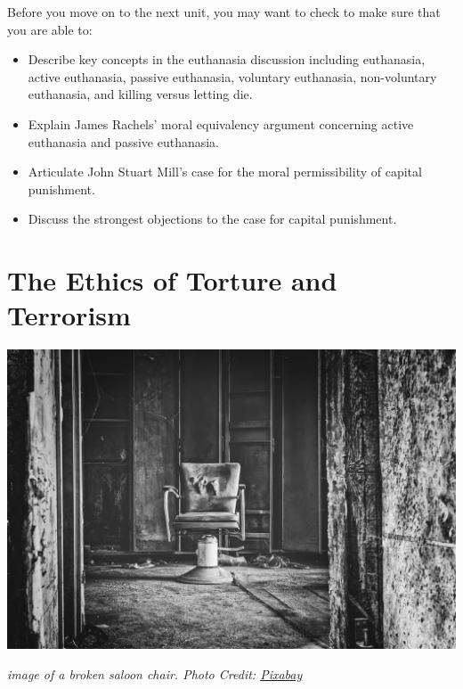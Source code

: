 \documentclass[
]{book}
\providecommand{\tightlist}{%
  \setlength{\itemsep}{0pt}\setlength{\parskip}{0pt}}
\begin{document}
\begin{progress}
Before you move on to the next unit, you may want to check to make sure that you
are able to:

\begin{itemize}
\tightlist
\item
  Describe key concepts in the euthanasia discussion including euthanasia, active euthanasia, passive euthanasia, voluntary euthanasia, non-voluntary euthanasia, and killing versus letting die.\\
\item
  Explain James Rachels' moral equivalency argument concerning active euthanasia and passive euthanasia.\\
\item
  Articulate John Stuart Mill's case for the moral permissibility of capital punishment.\\
\item
  Discuss the strongest objections to the case for capital punishment.
\end{itemize}
\end{progress}

\hypertarget{the-ethics-of-torture-and-terrorism}{%
\chapter{The Ethics of Torture and Terrorism}\label{the-ethics-of-torture-and-terrorism}}

\includegraphics{assets/unit-9/U9_chair-3624563_1920.jpg}

\emph{image of a broken saloon chair. Photo Credit: \href{https://pixabay.com/en/chair-seat-treatment-interrogation-3624563/}{Pixabay}}
\end{document}

